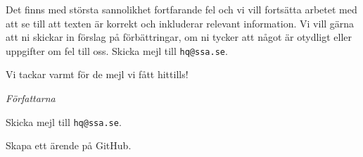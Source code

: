 Det finns med största sannolikhet fortfarande fel och vi vill fortsätta arbetet
med att se till att texten är korrekt och inkluderar relevant information.
Vi vill gärna att ni skickar in förslag på förbättringar, om ni tycker att något
är otydligt eller uppgifter om fel till oss.
Skicka mejl till \texttt{hq@ssa.se}.

\medskip

Vi tackar varmt för de mejl vi fått hittills!

\bigskip

\noindent\emph{Författarna}

\bigskip

\begin{tcolorbox}[sidebyside,colback=white,title=Två sätt att lämna återkoppling]
\begin{center}
\end{center}

Skicka mejl till \texttt{hq@ssa.se}.
\tcblower
\begin{center}
\end{center}

Skapa ett ärende på GitHub.
\end{tcolorbox}
